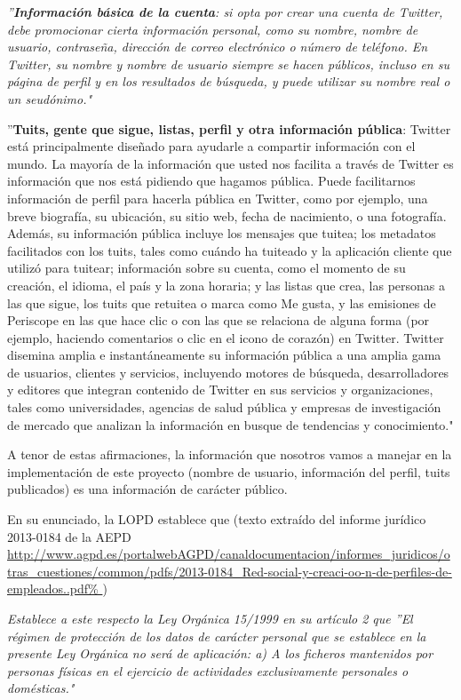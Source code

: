 \begin{center}
\noindent\begin{minipage}{0.9\linewidth}%
\centering%
{\em ''{\bf Información básica de la cuenta}: si opta por crear una cuenta de Twitter, debe promocionar cierta información personal, 
como su nombre, nombre de usuario, contraseña, dirección de correo electrónico o número de teléfono. 
En Twitter, su nombre y nombre de usuario siempre se hacen públicos, incluso en su página de perfil y en los resultados de búsqueda, 
y puede utilizar su nombre real o un seudónimo."

''{\bf Tuits, gente que sigue, listas, perfil y otra información pública}: Twitter está principalmente diseñado para ayudarle a 
compartir información con el mundo. La mayoría de la información que usted nos facilita a través de Twitter es información 
que nos está pidiendo que hagamos pública. Puede facilitarnos información de perfil para hacerla pública en Twitter, como por 
ejemplo, una breve biografía, su ubicación, su sitio web, fecha de nacimiento, o una fotografía. Además, su información pública 
incluye los mensajes que tuitea; los metadatos facilitados con los tuits, tales como cuándo ha tuiteado y la aplicación cliente 
que utilizó para tuitear; información sobre su cuenta, como el momento de su creación, el idioma, el país y la zona horaria; y las 
listas que crea, las personas a las que sigue, los tuits que retuitea o marca como Me gusta, y las emisiones de Periscope en las que 
hace clic o con las que se relaciona de alguna forma (por ejemplo, haciendo comentarios o clic en el icono de corazón) en Twitter. 
Twitter disemina amplia e instantáneamente su información pública a una amplia gama de usuarios, clientes y servicios, incluyendo 
motores de búsqueda, desarrolladores y editores que integran contenido de Twitter en sus servicios y organizaciones, tales como universidades, 
agencias de salud pública y empresas de investigación de mercado que analizan la información en busque de tendencias y conocimiento."}
\end{minipage}
\end{center}
A tenor de estas afirmaciones, la información que nosotros vamos a manejar en la implementación de este proyecto
(nombre de usuario, información del perfil, tuits publicados)
es una información de carácter público. 

En su enunciado, la LOPD establece que
(texto extraído del informe jurídico  2013-0184 de la AEPD
\url{http://www.agpd.es/portalwebAGPD/canaldocumentacion/informes_juridicos/otras_cuestiones/common/pdfs/2013-0184_Red-social-y-creaci-oo-n-de-perfiles-de-empleados..pdf%
})
\begin{center}
\noindent\begin{minipage}{0.9\linewidth}%
\centering%
{\em Establece a este
respecto la Ley Orgánica 15/1999 en su artículo 2 que ''El régimen de
protección de los datos de carácter personal que se establece en la
presente Ley Orgánica no será de aplicación: a) A los ficheros
mantenidos por personas físicas en el ejercicio de actividades
exclusivamente personales o domésticas."
}
\end{minipage}
\end{center}

